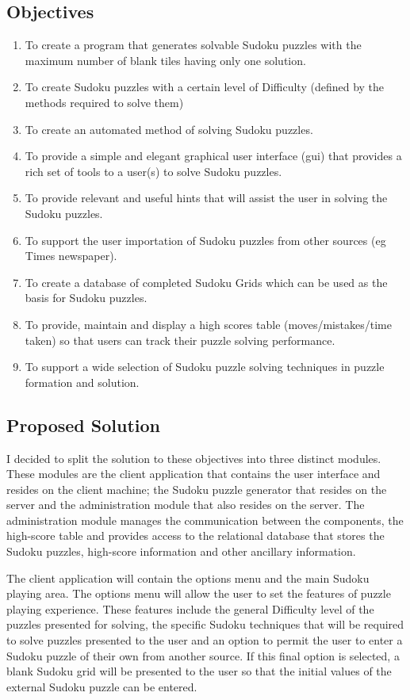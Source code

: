 \documentclass[fleqn]{article}
\begin{document}
\subsection{Objectives}
\begin{enumerate}
\item To create a program that generates solvable Sudoku puzzles with the maximum number of blank tiles having only one solution.
\item To create Sudoku puzzles with a certain level of Difficulty (defined by the methods required to solve them)
\item To create an automated method of solving Sudoku puzzles.
\item To provide a simple and elegant graphical user interface (gui) that provides a rich set of tools to a user(s) to solve Sudoku puzzles.
\item To provide relevant and useful hints that will assist the user in solving the Sudoku puzzles.
\item To support the user importation of Sudoku puzzles from other sources (eg Times newspaper).
\item To create a database of completed Sudoku Grids which can be used as the basis for Sudoku puzzles.
\item To provide, maintain and display a high scores table (moves/mistakes/time taken) so that users can track their puzzle solving performance.
\item To support a wide selection of Sudoku puzzle solving techniques in puzzle formation and solution.
\end{enumerate}


\subsection{Proposed Solution}
I decided to split the solution to these objectives into three distinct modules. These modules are the client application that contains the user interface and resides on the client machine; the Sudoku puzzle generator that resides on the server and the administration module that also resides on the server. The administration module manages the communication between the components, the high-score table and provides access to the relational database that stores the Sudoku puzzles, high-score information and other ancillary information.

The client application will contain the options menu and the main Sudoku playing area. The options menu will allow the user to set the features of puzzle playing experience. These features include the general Difficulty level of the puzzles presented for solving, the specific Sudoku techniques that will be required to solve puzzles presented to the user and an option to permit the user to enter a Sudoku puzzle of their own from another source. If this final option is selected, a blank Sudoku grid will be presented to the user so that the initial values of the external Sudoku puzzle can be entered.
\end{document}

